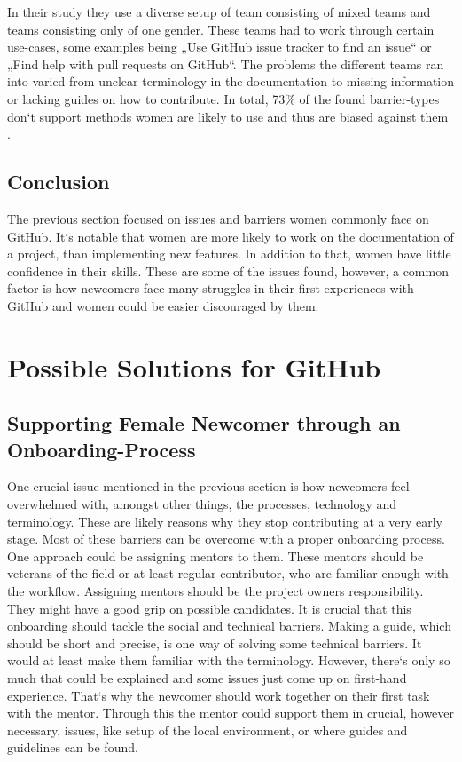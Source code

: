 \documentclass[a4paper, 11pt]{article}
\begin{document}
In their study they use a diverse setup of team consisting of mixed teams and teams consisting only of one gender. These teams had to work through certain use-cases, some examples being „Use GitHub issue tracker to find an issue“ or „Find help with pull requests on GitHub“. The problems the different teams ran into varied from unclear terminology in the documentation to missing information or lacking guides on how to contribute. In total, 73\% of the found barrier-types don‘t support methods women are likely to use and thus are biased against them \cite{open-source-barriers}.

\subsection{Conclusion}
The previous section focused on issues and barriers women commonly face on GitHub. It‘s notable that women are more likely to work on the documentation of a project, than implementing new features. In addition to that, women have little confidence in their skills. These are some of the issues found, however, a common factor is how newcomers face many struggles in their first experiences with GitHub and women could be easier discouraged by them.

\section{Possible Solutions for GitHub}
\subsection{Supporting Female Newcomer through an Onboarding-Process}

One crucial issue mentioned in the previous section is how newcomers feel overwhelmed with, amongst other things, the processes, technology and terminology. These are likely reasons why they stop contributing at a very early stage. Most of these barriers can be overcome with a proper onboarding process. One approach could be assigning mentors to them. These mentors should be veterans of the field or at least regular contributor, who are familiar enough with the workflow. Assigning mentors should be the project owners responsibility. They might have a good grip on possible candidates. It is crucial that this onboarding should tackle the social and technical barriers. Making a guide, which should be short and precise, is one way of solving some technical barriers. It would at least make them familiar with the terminology. However, there‘s only so much that could be explained and some issues just come up on first-hand experience. That‘s why the newcomer should work together on their first task with the mentor. Through this the mentor could support them in crucial, however necessary, issues, like setup of the local environment, or where guides and guidelines can be found. \newline
\end{document}
